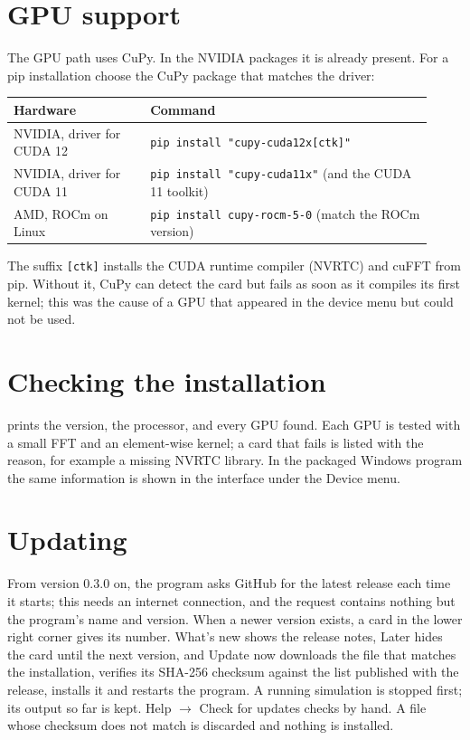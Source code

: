 \documentclass[11pt,a4paper,oneside]{book}
\newcommand{\code}[1]{\texttt{#1}}
\renewcommand{\_}{\textunderscore\allowbreak}
\newcommand{\menu}[1]{\textsf{#1}}
\begin{document}
\section{GPU support}\label{sec:gpu}

The GPU path uses CuPy. In the NVIDIA packages it is already present. For a pip installation choose the CuPy
package that matches the driver:
\begin{center}
\small
\begin{tabular}{>{\raggedright}p{0.3\linewidth}>{\raggedright\arraybackslash}p{0.62\linewidth}}
\toprule
Hardware & Command \\
\midrule
NVIDIA, driver for CUDA 12 & \code{pip install "cupy-cuda12x[ctk]"} \\
NVIDIA, driver for CUDA 11 & \code{pip install "cupy-cuda11x"} (and the CUDA 11 toolkit) \\
AMD, ROCm on Linux & \code{pip install cupy-rocm-5-0} (match the ROCm version) \\
\bottomrule
\end{tabular}
\end{center}
The suffix \code{[ctk]} installs the CUDA runtime compiler (NVRTC) and cuFFT from pip. Without it, CuPy can
detect the card but fails as soon as it compiles its first kernel; this was the cause of a GPU that appeared in the
device menu but could not be used.

\section{Checking the installation}

prints the version, the processor, and every GPU found. Each GPU is tested with a small FFT and an element-wise
kernel; a card that fails is listed with the reason, for example a missing NVRTC library. In the packaged Windows
program the same information is shown in the interface under the \menu{Device} menu.

\section{Updating}

From version 0.3.0 on, the program asks GitHub for the latest release each time it starts; this needs an internet
connection, and the request contains nothing but the program's name and version. When a newer version exists, a
card in the lower right corner gives its number. \menu{What's new} shows the release notes, \menu{Later} hides the
card until the next version, and \menu{Update now} downloads the file that matches the installation, verifies its
SHA-256 checksum against the list published with the release, installs it and restarts the program. A running
simulation is stopped first; its output so far is kept. \menu{Help} $\rightarrow$ \menu{Check for updates} checks
by hand. A file whose checksum does not match is discarded and nothing is installed.
\end{document}
